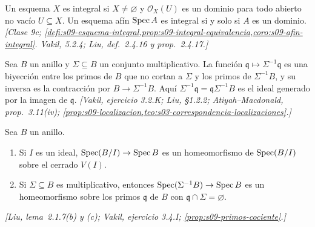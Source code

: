 \begin{defi}
\label{defi:s11-integral}
Un esquema \(X\) es integral si \(X\ne\varnothing\) y \(\mathcal O_X(U)\) es un dominio para todo abierto no vacío \(U\subseteq X\). Un esquema afín \(\operatorname{Spec} A\) es integral si y solo si \(A\) es un dominio. \emph{[Clase 9c; \cref{defi:s09-esquema-integral,prop:s09-integral-equivalencia,coro:s09-afin-integral}. Vakil, 5.2.4; Liu, def.~2.4.16 y prop.~2.4.17.]}
\end{defi}

\begin{prop}
\label{prop:s11-primos-localizacion}
Sea \(B\) un anillo y \(\Sigma\subseteq B\) un conjunto multiplicativo. La función \(\mathfrak q\mapsto\Sigma^{-1}\mathfrak q\) es una biyección entre los primos de \(B\) que no cortan a \(\Sigma\) y los primos de \(\Sigma^{-1}B\), y su inversa es la contracción por \(B\to\Sigma^{-1}B\). Aquí \(\Sigma^{-1}\mathfrak q=\mathfrak q\Sigma^{-1}B\) es el ideal generado por la imagen de \(\mathfrak q\). \emph{[Vakil, ejercicio 3.2.K; Liu, \S1.2.2; Atiyah--Macdonald, prop.~3.11(iv); \cref{prop:s09-localizacion,teo:s03-correspondencia-localizaciones}.]}
\end{prop}

\begin{prop}
\label{prop:s11-topologia-cociente}
Sea \(B\) un anillo.
\begin{enumerate}[label=(\alph*)]
\item Si \(I\) es un ideal, \(\operatorname{Spec}(B/I)\to\operatorname{Spec} B\) es un homeomorfismo de \(\operatorname{Spec}(B/I)\) sobre el cerrado \(V(I)\).
\item Si \(\Sigma\subseteq B\) es multiplicativo, entonces \(\operatorname{Spec}(\Sigma^{-1}B)\to\operatorname{Spec} B\) es un homeomorfismo sobre los primos \(\mathfrak q\) de \(B\) con \(\mathfrak q\cap\Sigma=\varnothing\).
\end{enumerate}
\emph{[Liu, lema~2.1.7(b) y (c); Vakil, ejercicio 3.4.I; \cref{prop:s09-primos-cociente}.]}
\end{prop}


